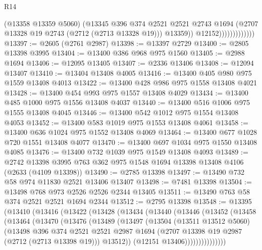 \begin{lexlean}{R14}
\begin{coremodule}
                                (@13358 @13359 @5060)
                                (@13345
                                  @396
                                  @374
                                  @2521
                                  @2521
                                  @2743
                                  @1694
                                  (@2707 @13328 @19 @2743 (@2712 (@2713 @13328 @19)))
                                  @13359))
                              @12152)))))))))))))
@13397 := @2605 (@2761 @2987)
@13398 := @13397 @2729
@13400 := @2805 @13398 @3995
@13404 := @13400 @386 @968 @975 @1560
@13405 := @2988 @1694
@13406 := @12095 @13405
@13407 := @2336 @13406
@13408 := @12094 @13407
@13410 := @13404 @13408 @4005
@13416 := @13400 @405 @980 @975 @1559 @13408 @4013
@13422 := @13400 @428 @986 @975 @1558 @13408 @4021
@13428 := @13400 @454 @993 @975 @1557 @13408 @4029
@13434 := @13400 @485 @1000 @975 @1556 @13408 @4037
@13440 := @13400 @516 @1006 @975 @1555 @13408 @4045
@13446 := @13400 @542 @1012 @975 @1554 @13408 @4053
@13452 := @13400 @583 @1019 @975 @1553 @13408 @4061
@13458 := @13400 @636 @1024 @975 @1552 @13408 @4069
@13464 := @13400 @677 @1028 @720 @1551 @13408 @4077
@13470 := @13400 @697 @1034 @975 @1550 @13408 @4085
@13476 := @13400 @732 @1039 @975 @1549 @13408 @4093
@13489 := @2742 @13398 @3995 @763 @362 @975 @1548 @1694 @13398 @13408 @4106 (@2633 (@4109 @13398))
@13490 := @2785 @13398
@13497 := @13490 @732 @58 @974 @11830 @2521 @13406 @13407
@13498 := @7481 @13398
@13504 := @13498 @768 @973 @2526 @2526 @2344 @13405
@13511 := @13490 @763 @58 @374 @2521 @2521 @1694 @2344
@13512 := @2795 @13398
@13548 := @13395
    (@13410
      (@13416
        (@13422
          (@13428
            (@13434
              (@13440
                (@13446
                  (@13452
                    (@13458
                      (@13464
                        (@13470
                          (@13476
                            (@13489
                              (@13497
                                (@13504
                                  (@13511 @13512 @5060)
                                  (@13498
                                    @396
                                    @374
                                    @2521
                                    @2521
                                    @2987
                                    @1694
                                    (@2707 @13398 @19 @2987 (@2712 (@2713 @13398 @19)))
                                    @13512))
                                (@12151 @13406)))))))))))))))

\end{coremodule}
\end{lexlean}
